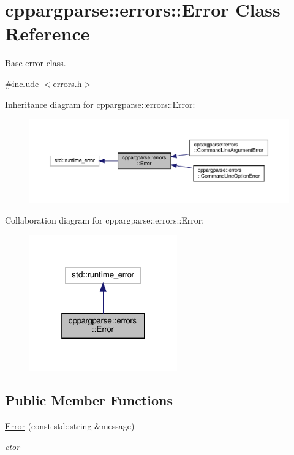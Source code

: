 \hypertarget{classcppargparse_1_1errors_1_1Error}{}\section{cppargparse\+:\+:errors\+:\+:Error Class Reference}
\label{classcppargparse_1_1errors_1_1Error}


Base error class.  




{\ttfamily \#include $<$errors.\+h$>$}



Inheritance diagram for cppargparse\+:\+:errors\+:\+:Error\+:\nopagebreak
\begin{figure}[H]
\begin{center}
\leavevmode
\includegraphics[width=350pt]{classcppargparse_1_1errors_1_1Error__inherit__graph}
\end{center}
\end{figure}


Collaboration diagram for cppargparse\+:\+:errors\+:\+:Error\+:\nopagebreak
\begin{figure}[H]
\begin{center}
\leavevmode
\includegraphics[width=181pt]{classcppargparse_1_1errors_1_1Error__coll__graph}
\end{center}
\end{figure}
\subsection*{Public Member Functions}
\begin{DoxyCompactItemize}
\item 
\hyperlink{classcppargparse_1_1errors_1_1Error_a41c12888d001504fbaec210c5574b91a}{Error} (const std\+::string \&message)
\begin{DoxyCompactList}\small\item\em c\textquotesingle{}tor \end{DoxyCompactList}\end{DoxyCompactItemize}


